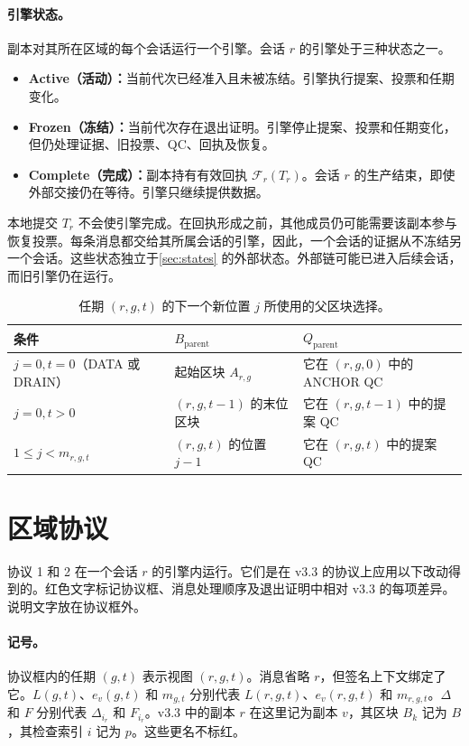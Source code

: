 \documentclass[11pt,a4paper]{article}
\newcommand{\RR}[1]{{\color{rrRed}#1}}
\newcommand{\FC}{\mathcal F}
\newcounter{protocol}
\begin{document}
\paragraph{引擎状态。}
副本对其所在区域的每个会话运行一个引擎。会话 $r$ 的引擎处于三种状态之一。
\begin{itemize}
\item \textbf{Active（活动）：}当前代次已经准入且未被冻结。引擎执行提案、投票和任期变化。
\item \textbf{Frozen（冻结）：}当前代次存在退出证明。引擎停止提案、投票和任期变化，但仍处理证据、旧投票、QC、回执及恢复。
\item \textbf{Complete（完成）：}副本持有有效回执 $\FC_r(T_r)$。会话 $r$ 的生产结束，即使外部交接仍在等待。引擎只继续提供数据。
\end{itemize}
本地提交 $T_r$ 不会使引擎完成。在回执形成之前，其他成员仍可能需要该副本参与恢复投票。每条消息都交给其所属会话的引擎，因此，一个会话的证据从不冻结另一个会话。这些状态独立于\cref{sec:states} 的外部状态。外部链可能已进入后续会话，而旧引擎仍在运行。
\begin{table}[htbp]\centering\small
\caption{任期 $(r,g,t)$ 的下一个新位置 $j$ 所使用的父区块选择。}\label{tab:parent}
\begin{tabularx}{\linewidth}{@{}l Y Y@{}}\toprule
条件 & $B_{\mathrm{parent}}$ & $Q_{\mathrm{parent}}$\\\midrule
$j=0,t=0$（DATA 或 DRAIN） & 起始区块 $A_{r,g}$ & 它在 $(r,g,0)$ 中的 ANCHOR QC\\
$j=0,t>0$ & $(r,g,t-1)$ 的末位区块 & 它在 $(r,g,t-1)$ 中的提案 QC\\
$1\le j<m_{r,g,t}$ & $(r,g,t)$ 的位置 $j-1$ & 它在 $(r,g,t)$ 中的提案 QC\\\bottomrule
\end{tabularx}
\end{table}

\section{区域协议}\label{sec:protocols}
协议 1 和 2 在一个会话 $r$ 的引擎内运行。它们是在 v3.3 的协议上应用以下改动得到的。\RR{红色文字}标记协议框、消息处理顺序及退出证明中相对 v3.3 的每项差异。说明文字放在协议框外。

\paragraph{记号。}
协议框内的任期 $(g,t)$ 表示视图 $(r,g,t)$。消息省略 $r$，但签名上下文绑定了它。$L(g,t)$、$e_v(g,t)$ 和 $m_{g,t}$ 分别代表 $L(r,g,t)$、$e_v(r,g,t)$ 和 $m_{r,g,t}$。$\Delta$ 和 $F$ 分别代表 $\Delta_{i_r}$ 和 $F_{i_r}$。v3.3 中的副本 $r$ 在这里记为副本 $v$，其区块 $B_k$ 记为 $B$，其检查索引 $i$ 记为 $p$。这些更名不标红。
\end{document}
